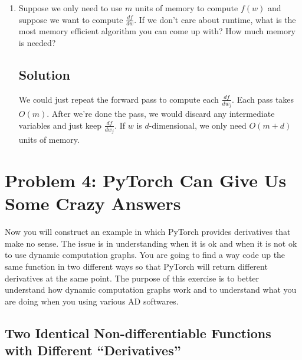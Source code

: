 \documentclass[letterpaper,11pt]{article}
\begin{document}
\begin{enumerate}
\item Suppose we only need to use $m$ units of memory to compute $f(w)$ and
  suppose we want to compute $\frac{df}{dw}$. If we don't care about runtime,
  what is the most memory efficient algorithm you can come up with? How much
  memory is needed?

  \subsection*{Solution}

  We could just repeat the forward pass to compute each $\frac{df}{dw_j}$. Each
  pass takes $O(m)$. After we're done the pass, we would discard any
  intermediate variables and just keep $\frac{df}{dw_j}$. If $w$ is
  $d$-dimensional, we only need $O(m + d)$ units of memory.
  
\end{enumerate}

\section*{Problem 4: PyTorch Can Give Us Some Crazy Answers}

Now you will construct an example in which PyTorch provides derivatives that
make no sense. The issue is in understanding when it is ok and when it is not ok
to use dynamic computation graphs. You are going to find a way code up the same
function in two different ways so that PyTorch will return different derivatives
at the same point. The purpose of this exercise is to better understand how
dynamic computation graphs work and to understand what you are doing when you
using various AD softwares.

\subsection*{Two Identical Non-differentiable Functions with Different ``Derivatives''}
\end{document}
